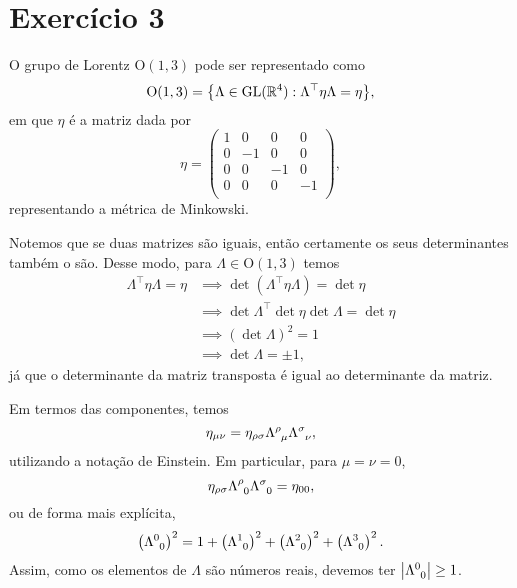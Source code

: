 \documentclass[12pt,a4paper]{article}
\numberwithin{equation}{section}
\DeclarePairedDelimiter\set{\{}{\}}
\begin{document}
\section*{Exercício 3}
O grupo de Lorentz \(\mathrm{O}(1,3)\) pode ser representado como \begin{equation*}
    \mathrm{O}(1,3) = \set*{\Lambda \in \mathrm{GL}(\mathbb{R}^4) : \Lambda^\top \eta \Lambda = \eta},
\end{equation*}
em que \(\eta\) é a matriz dada por
\begin{equation*}
    \eta = \begin{pmatrix}
        1 & 0 & 0 & 0\\
        0 & -1 & 0 & 0\\
        0 & 0 & -1 & 0\\
        0 & 0 & 0 & -1\\
    \end{pmatrix},
\end{equation*}
representando a métrica de Minkowski.

Notemos que se duas matrizes são iguais, então certamente os seus determinantes também o são. Desse modo, para \(\Lambda \in \mathrm{O}(1,3)\) temos
\begin{align*}
    \Lambda^\top \eta \Lambda = \eta &\implies \det\left(\Lambda^\top \eta \Lambda\right) = \det \eta\\
                                     &\implies \det \Lambda^\top \det \eta \det \Lambda = \det \eta\\
                                     &\implies \left(\det \Lambda\right)^2 = 1\\
                                     &\implies \det \Lambda = \pm 1,
\end{align*}
já que o determinante da matriz transposta é igual ao determinante da matriz.

Em termos das componentes, temos
\begin{equation*}
    \eta_{\mu\nu} = \eta_{\rho\sigma}\Lambda\indices{^\rho_\mu}\Lambda\indices{^\sigma_\nu},
\end{equation*}
utilizando a notação de Einstein. Em particular, para \(\mu = \nu = 0\),
\begin{equation*}
    \eta_{\rho\sigma}\Lambda\indices{^\rho_0}\Lambda\indices{^\sigma_0} = \eta_{00},
\end{equation*}
ou de forma mais explícita,
\begin{equation*}
    \left(\Lambda\indices{^0_0}\right)^2 = 1 + \left(\Lambda\indices{^1_0}\right)^2+ \left(\Lambda\indices{^2_0}\right)^2+ \left(\Lambda\indices{^3_0}\right)^2.
\end{equation*}
Assim, como os elementos de \(\Lambda\) são números reais, devemos ter \(\left|\Lambda\indices{^0_0}\right| \geq 1\).
\end{document}
